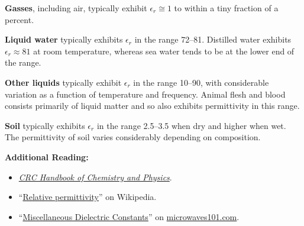 {\bf Gasses}, including air, typically exhibit $\epsilon_r\cong 1$ to within a tiny fraction of a percent. 

{\bf Liquid water} 
typically exhibits $\epsilon_r$ in the range 72--81. Distilled water exhibits $\epsilon_r \approx 81$ at room temperature, whereas sea water tends to be at the lower end of the range.    

{\bf Other liquids} typically exhibit $\epsilon_r$ in the range 10--90, with considerable variation as a function of temperature and frequency.  Animal flesh and blood consists primarily of liquid matter and so also exhibits permittivity in this range.

{\bf Soil} 
typically exhibits $\epsilon_r$ in the range 2.5--3.5 when dry and higher when wet.  The permittivity of soil varies considerably depending on composition.


{\bf Additional Reading:}
\begin{itemize}
\item \href{http://hbcponline.com}{\emph{CRC Handbook of Chemistry and Physics}}.
\item ``\href{https://en.wikipedia.org/wiki/Relative_permittivity}{Relative permittivity}'' on Wikipedia.
\item ``\href{http://www.microwaves101.com/encyclopedias/miscellaneous-dielectric-constants}{Miscellaneous Dielectric Constants}'' on \href{http://www.microwaves101.com}{microwaves101.com}.
\end{itemize}



